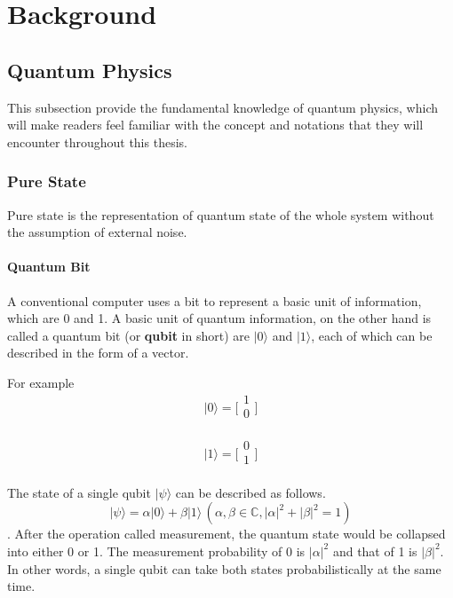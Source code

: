 \chapter{Background}
\label{background}

\section{Quantum Physics}

This subsection provide the fundamental knowledge of quantum physics, which will make readers feel familiar with the concept and notations that they will encounter throughout this thesis.


\subsection{Pure State}

Pure state is the representation of quantum state of the whole system without the assumption of external noise.

\subsubsection{Quantum Bit}

A conventional computer uses a bit to represent a basic unit of information, which are 0 and 1. A basic unit of quantum information, on the other hand is called a quantum bit (or \textbf{qubit} in short) are $|0\rangle$ and $|1\rangle$, each of which can be described in the form of a vector. 

For example  
 $$|0\rangle = \Big[
\begin{array}{c}
1 \\
0 \\
\end{array}
\Big]
$$

$$|1\rangle = \Big[
\begin{array}{c}
0 \\
1 \\
\end{array}
\Big]$$

The state of a single qubit $|\psi\rangle$ can be described as follows.
$$ |\psi\rangle = \alpha |0\rangle + \beta |1\rangle \,(\alpha, \beta \in \mathbb{C}, |\alpha|^2+|\beta|^2=1)$$.
 After the operation called measurement, the quantum state would be collapsed into either 0 or 1.  The measurement probability of 0 is $|\alpha|^2$ and that of 1 is $|\beta|^2$. In other words, a single qubit can take both states probabilistically at the same time.  
 
